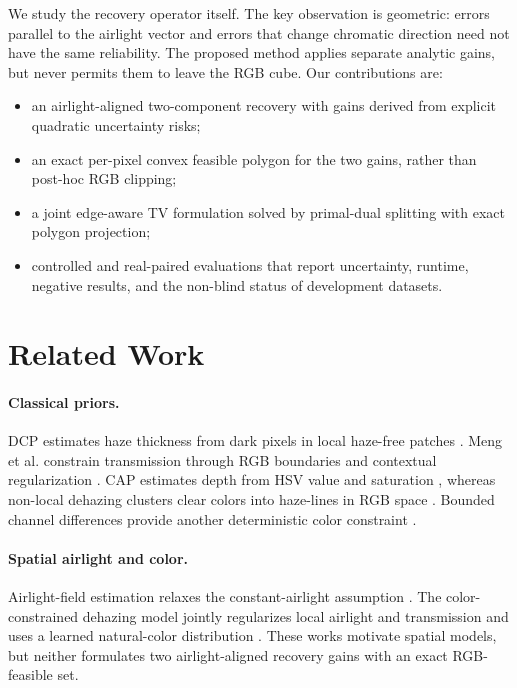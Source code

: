 \documentclass[10pt,twocolumn]{article}
\begin{document}
We study the recovery operator itself. The key observation is geometric: errors parallel to the
airlight vector and errors that change chromatic direction need not have the same reliability.
The proposed method applies separate analytic gains, but never permits them to leave the RGB cube.
Our contributions are:
\begin{itemize}
  \item an airlight-aligned two-component recovery with gains derived from explicit quadratic
        uncertainty risks;
  \item an exact per-pixel convex feasible polygon for the two gains, rather than post-hoc RGB
        clipping;
  \item a joint edge-aware TV formulation solved by primal-dual splitting with exact polygon
        projection;
  \item controlled and real-paired evaluations that report uncertainty, runtime, negative results,
        and the non-blind status of development datasets.
\end{itemize}

\section{Related Work}
\paragraph{Classical priors.}
DCP estimates haze thickness from dark pixels in local haze-free patches \cite{he2011dcp}.
Meng et al. constrain transmission through RGB boundaries and contextual regularization
\cite{meng2013boundary}. CAP estimates depth from HSV value and saturation \cite{zhu2015cap},
whereas non-local dehazing clusters clear colors into haze-lines in RGB space
\cite{berman2016nonlocal}. Bounded channel differences provide another deterministic color
constraint \cite{zhao2021bcdp}.

\paragraph{Spatial airlight and color.}
Airlight-field estimation relaxes the constant-airlight assumption \cite{zhang2018airlight}.
The color-constrained dehazing model jointly regularizes local airlight and transmission and uses
a learned natural-color distribution \cite{zhang2020color}. These works motivate spatial models,
but neither formulates two airlight-aligned recovery gains with an exact RGB-feasible set.
\end{document}
